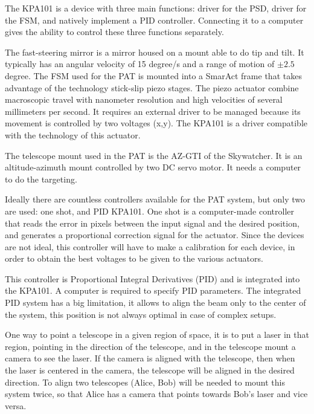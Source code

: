 The KPA101 is a device with three main functions: driver for the PSD, driver for the FSM, and natively implement a PID controller. Connecting it to a computer gives the ability to control these three functions separately.


The fast-steering mirror is a mirror housed on a mount able to do tip and tilt. It typically has an angular velocity of 15 degree/s and a range of motion of $\pm 2.5$ degree.
The FSM used for the PAT is mounted into a SmarAct frame that takes advantage of the technology stick-slip piezo stages. The piezo actuator combine macroscopic travel with nanometer resolution and high velocities of several millimeters per second.
It requires an external driver to be managed because its movement is controlled by two voltages (x,y). The KPA101 is a driver compatible with the technology of this actuator.

The telescope mount used in the PAT is the AZ-GTI of the Skywatcher. It is an altitude-azimuth mount controlled by two DC servo motor. It needs a computer to do the targeting.

Ideally there are countless controllers available for the PAT system, but only two are used: one shot, and PID KPA101.
One shot is a computer-made controller that reads the error in pixels between the input signal and the desired position, and generates a proportional correction signal for the actuator.
Since the devices are not ideal, this controller will have to make a calibration for each device, in order to obtain the best voltages to be given to the various actuators.

This controller is Proportional Integral Derivatives (PID) and is integrated into the KPA101. A computer is required to specify PID parameters. The integrated PID system has a big limitation, it allows to align the beam only to the center of the system, this position is not always optimal in case of complex setups.

One way to point a telescope in a given region of space, it is to put a laser in that region, pointing in the direction of the telescope, and in the telescope mount a camera to see the laser.
If the camera is aligned with the telescope, then when the laser is centered in the camera, the telescope will be aligned in the desired direction.
To align two telescopes (Alice, Bob) will be needed to mount this system twice, so that Alice has a camera that points towards Bob’s laser and vice versa.

